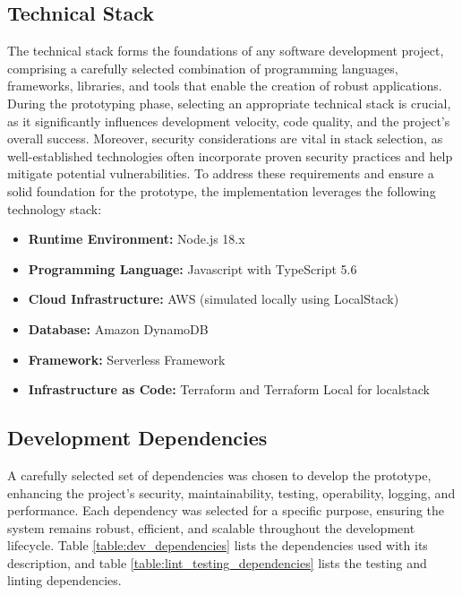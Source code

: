 \subsection{Technical Stack}
The technical stack forms the foundations of any software development project, comprising a carefully selected combination of programming languages, frameworks, libraries, and tools that enable the creation of robust applications. During the prototyping phase, selecting an appropriate technical stack is crucial, as it significantly influences development velocity, code quality, and the project's overall success. Moreover, security considerations are vital in stack selection, as well-established technologies often incorporate proven security practices and help mitigate potential vulnerabilities. To address these requirements and ensure a solid foundation for the prototype, the implementation leverages the following technology stack:

\begin{itemize}
    \item \textbf{Runtime Environment:} Node.js 18.x
    \item \textbf{Programming Language:} Javascript with TypeScript 5.6
    \item \textbf{Cloud Infrastructure:} AWS (simulated locally using LocalStack)
    \item \textbf{Database:} Amazon DynamoDB
    \item \textbf{Framework:} Serverless Framework
    \item \textbf{Infrastructure as Code:} Terraform and Terraform Local for localstack

\end{itemize}

\subsection{Development Dependencies}
A carefully selected set of dependencies was chosen to develop the prototype, enhancing the project's security, maintainability, testing, operability, logging, and performance. Each dependency was selected for a specific purpose, ensuring the system remains robust, efficient, and scalable throughout the development lifecycle. Table \ref{table:dev_dependencies} lists the dependencies used with its description, and table \ref{table:lint_testing_dependencies} lists the testing and linting dependencies. 


